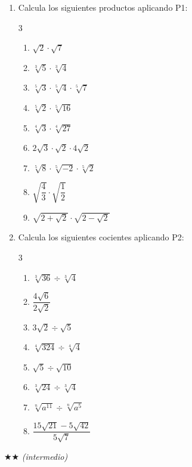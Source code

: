 \documentclass[11pt, letterpaper]{article}
\begin{document}
\begin{enumerate}[label=\textbf{\arabic*.}, leftmargin=*]
  \item Calcula los siguientes productos aplicando P1:
  \begin{multicols}{3}
  \begin{enumerate}[label=\alph*)]
    \item $\sqrt{2}\cdot\sqrt{7}$
    \item $\sqrt[3]{5}\cdot\sqrt[3]{4}$
    \item $\sqrt[5]{3}\cdot\sqrt[5]{4}\cdot\sqrt[5]{7}$
    \item $\sqrt[5]{2}\cdot\sqrt[5]{16}$
    \item $\sqrt[4]{3}\cdot\sqrt[4]{27}$
    \item $2\sqrt{3}\cdot\sqrt{2}\cdot 4\sqrt{2}$
    \item $\sqrt[5]{8}\cdot\sqrt[5]{-2}\cdot\sqrt[5]{2}$
    \item $\sqrt{\dfrac{4}{3}}\cdot\sqrt{\dfrac{1}{2}}$
    \item $\sqrt{2+\sqrt{2}}\cdot\sqrt{2-\sqrt{2}}$
  \end{enumerate}
  \end{multicols}

  \item Calcula los siguientes cocientes aplicando P2:
  \begin{multicols}{3}
  \begin{enumerate}[label=\alph*)]
    \item $\sqrt[3]{36}\div\sqrt[3]{4}$
    \item $\dfrac{4\sqrt{6}}{2\sqrt{2}}$
    \item $3\sqrt{2}\div\sqrt{5}$
    \item $\sqrt[4]{324}\div\sqrt[4]{4}$
    \item $\sqrt{5}\div\sqrt{10}$
    \item $\sqrt[3]{24}\div\sqrt[3]{4}$
    \item $\sqrt[n]{a^{11}}\div\sqrt[n]{a^5}$
    \item $\dfrac{15\sqrt{21}-5\sqrt{42}}{5\sqrt{7}}$
  \end{enumerate}
  \end{multicols}
\end{enumerate}

$\bigstar\bigstar$ \textit{(intermedio)}
\end{document}
